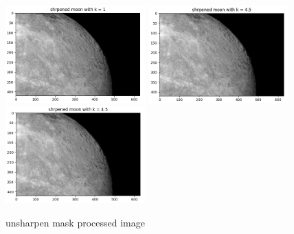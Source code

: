 \begin{figure}[htbp]
	\includegraphics[width=0.48\textwidth]{../images/p2/p2c_sharpened_2_1.png}
	\includegraphics[width=0.48\textwidth]{../images/p2/p2c_sharpened_1_45.png}
	\includegraphics[width=0.48\textwidth]{../images/p2/p2c_sharpened_2_45.png}
    \caption{unsharpen mask processed image}
\label{fig:p2c}
\end{figure}

\newpage